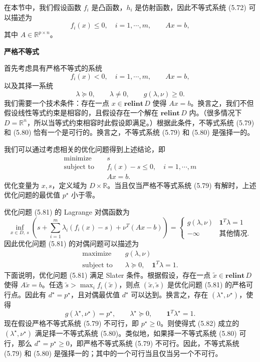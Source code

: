 \documentclass[UTF8, 12pt, fontset=fandol, oneside]{ctexart}
\begin{document}
在本节中，我们假设函数 $f_i$ 是凸函数，$h_i$ 是仿射函数，因此不等式系统 (5.72) 可以描述为
\[
f_i(x)\leq 0,\quad i=1,\cdots,m,\qquad Ax=b,
\]
其中 $A\in\mathbb{R}^{p\times n}$。

\noindent\textbf{严格不等式}

首先考虑具有严格不等式的系统
\begin{equation}
f_i(x)<0,\quad i=1,\cdots,m,\qquad Ax=b,
\tag{5.79}
\end{equation}
以及其择一系统
\begin{equation}
\lambda\succeq 0,\qquad \lambda\neq 0,\qquad g(\lambda,\nu)\geq 0.
\tag{5.80}
\end{equation}
我们需要一个技术条件：存在一点 $x\in\mathbf{relint}\,D$ 使得 $Ax=b$。换言之，我们不但假设线性等式约束是相容的，且假设存在一个解在 $\mathbf{relint}\,D$ 内。（很多情况下 $D=\mathbb{R}^n$，所以当等式约束相容时此假设即满足。）根据此条件，不等式系统 (5.79) 和 (5.80) 恰有一个是可行的。换言之，不等式系统 (5.79) 和 (5.80) 是强择一的。

我们可以通过考虑相关的优化问题得到上述结论，即
\begin{equation}
\begin{aligned}
\text{minimize}\quad & s\\
\text{subject to}\quad & f_i(x)-s\leq 0,\quad i=1,\cdots,m\\
& Ax=b.
\end{aligned}
\tag{5.81}
\end{equation}
优化变量为 $x,s$，定义域为 $D\times\mathbb{R}$。当且仅当严格不等式系统 (5.79) 有解时，上述优化问题的最优值 $p^\star$ 小于零。

优化问题 (5.81) 的 Lagrange 对偶函数为
\[
\inf_{x\in D,\ s}\left(s+\sum_{i=1}^m\lambda_i(f_i(x)-s)+\nu^T(Ax-b)\right)
=
\begin{cases}
g(\lambda,\nu) & \mathbf{1}^T\lambda=1\\
-\infty & \text{其他情况}.
\end{cases}
\]
因此优化问题 (5.81) 的对偶问题可以描述为
\[
\begin{aligned}
\text{maximize}\quad & g(\lambda,\nu)\\
\text{subject to}\quad & \lambda\succeq 0,\quad \mathbf{1}^T\lambda=1.
\end{aligned}
\]
下面说明，优化问题 (5.81) 满足 Slater 条件。根据假设，存在一点 $\tilde{x}\in\mathbf{relint}\,D$ 使得 $A\tilde{x}=b$。任选 $\tilde{s}>\max_i f_i(\tilde{x})$，则点 $(\tilde{x},\tilde{s})$ 是优化问题 (5.81) 的严格可行点。因此有 $d^\star=p^\star$，且对偶最优值 $d^\star$ 可以达到。换言之，存在 $(\lambda^\star,\nu^\star)$，使得
\begin{equation}
g(\lambda^\star,\nu^\star)=p^\star,\qquad \lambda^\star\succeq 0,\qquad \mathbf{1}^T\lambda^\star=1.
\tag{5.82}
\end{equation}
现在假设严格不等式系统 (5.79) 不可行，即 $p^\star\geq 0$。则使得式 (5.82) 成立的 $(\lambda^\star,\nu^\star)$ 满足择一不等式系统 (5.80)。类似地，如果择一不等式系统 (5.80) 可行，那么 $d^\star=p^\star\geq 0$，即严格不等式系统 (5.79) 不可行。因此，不等式系统 (5.79) 和 (5.80) 是强择一的；其中的一个可行当且仅当另一个不可行。
\end{document}
